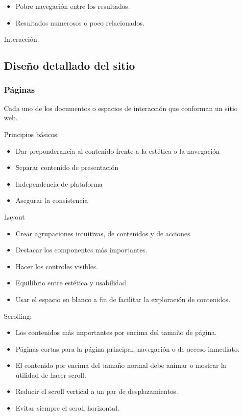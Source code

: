 \documentclass[12pt, twoside, openright]{report} %
\begin{document}
\begin{itemize}
\begin{itemize}
        \begin{itemize}
          \item Pobre navegación entre los
      resultados.
          \item
            Resultados numerosos o poco relacionados.
        \end{itemize}
    \end{itemize}
\end{itemize}

Interacción.

\subsection{Diseño detallado del sitio}
\subsubsection{Páginas}
Cada uno de los documentos o espacios de interacción que conforman un sitio
  web. 

Principios básicos: 
\begin{itemize}
  \item Dar preponderancia al contenido frente a
  la estética o la navegación
  \item Separar contenido de presentación
  \item Independencia de plataforma
  \item Asegurar la consistencia
\end{itemize}

Layout
\begin{itemize}
  \item Crear agrupaciones intuitivas, de contenidos y de acciones.
  \item Destacar los componentes más importantes.
  \item  Hacer los controles visibles.
  \item Equilibrio entre estética y usabilidad.
  \item Usar el espacio en blanco a
  fin de facilitar la exploración de contenidos. 
\end{itemize}

Scrolling: 
\begin{itemize}
  \item Los contenidos más importantes por encima del tamaño de página.
  \item Páginas cortas para la página principal, navegación o de acceso inmediato.
  \item El contenido por encima del tamaño normal debe animar o mostrar la
  utilidad de hacer scroll.
  \item Reducir el scroll vertical a un par de
  desplazamientos.
  \item Evitar siempre el scroll horizontal.
\end{itemize}
\end{document}
